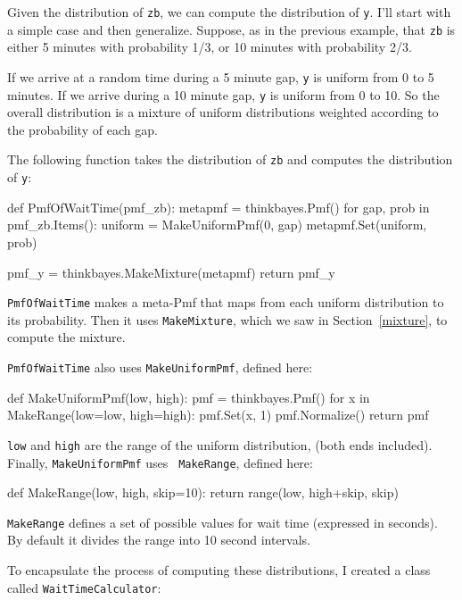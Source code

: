 \documentclass[12pt]{book}
\theoremstyle{exercise}
\newcommand{\py}[1]{{\tt #1}}%
\begin{document}
Given the distribution of \py{zb}, we can compute the distribution of
\py{y}.  I'll start with a simple case and then generalize.
Suppose, as in the previous example, that \py{zb} is either 5 minutes
with probability 1/3, or 10 minutes with probability 2/3.

If we arrive at a random time during a 5 minute gap,
\py{y} is uniform from 0 to 5 minutes.  If we arrive during a 10
minute gap, \py{y} is uniform from 0 to 10.  So the overall
distribution is a mixture of uniform distributions weighted
according to the probability of each gap.

The following function takes the distribution of \py{zb} and
computes the distribution of \py{y}:

\begin{code}
def PmfOfWaitTime(pmf_zb):
    metapmf = thinkbayes.Pmf()
    for gap, prob in pmf_zb.Items():
        uniform = MakeUniformPmf(0, gap)
        metapmf.Set(uniform, prob)

    pmf_y = thinkbayes.MakeMixture(metapmf)
    return pmf_y
\end{code}

\py{PmfOfWaitTime} makes a meta-Pmf that maps from each uniform
distribution to its probability.  Then it uses \py{MakeMixture},
which we saw in Section~\ref{mixture}, to compute the mixture.

\py{PmfOfWaitTime} also uses \py{MakeUniformPmf}, defined here:

\begin{code}
def MakeUniformPmf(low, high):
    pmf = thinkbayes.Pmf()
    for x in MakeRange(low=low, high=high):
        pmf.Set(x, 1)
    pmf.Normalize()
    return pmf
\end{code}

\py{low} and \py{high} are the range of the uniform distribution,
(both ends included).  Finally, \py{MakeUniformPmf} uses {\tt
  MakeRange}, defined here:

\begin{code}
def MakeRange(low, high, skip=10):
    return range(low, high+skip, skip)
\end{code}

\py{MakeRange} defines a set of possible values for wait time
(expressed in seconds).  By default it divides the range into
10 second intervals.

To encapsulate the process of computing these distributions, I
created a class called \py{WaitTimeCalculator}:
\end{document}
